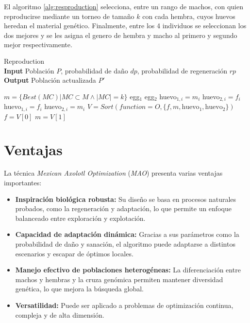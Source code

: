  El algoritmo \ref{alg:resproduction} selecciona, entre un rango de machos, con quien reproducirse mediante un torneo de tamaño $k$ con cada hembra, cuyos huevos heredan el material genético. Finalmente, entre los 4 individuos se seleccionan los dos mejores y se les asigna el genero de hembra y macho al primero y segundo mejor respectivamente.
 
   \begin{algorithm}[H]
 	\caption{Reproduction \\
 		\textbf{Input} Población $P$, probabilidad de daño $dp$, probabilidad de regeneración $rp$ \\
 		\textbf{Output}  Población actualizada $P'$} 
 	\begin{algorithmic}[1]
 			\State $m = \{Best(MC) | MC \subset M \land |MC| = k\}$
 			\State egg$_1$
 			\State egg$_2$
 					\State huevo$_{1,i} = m_i$
 					\State huevo$_{2,i} = f_i$ 
 				\Else
 					\State huevo$_{1,i} = f_i$
 					\State huevo$_{2,i} = m_i$ 
 				\EndIf
 			\EndFor
 		\EndFor
 		\State $V=Sort(function= O, \{ f, m, \text{huevo}_1, \text{huevo}_2 \})$
 		\State $f = V[0]$
 		\State $m = V[1]$
 	\end{algorithmic}
 	\label{alg:resproduction}
 \end{algorithm}
 

\section{Ventajas}

La técnica \textit{Mexican Axolotl Optimization} (\textit{MAO}) presenta varias ventajas importantes:

\begin{itemize}
	\item \textbf{Inspiración biológica robusta:} Su diseño se basa en procesos naturales probados, como la regeneración y adaptación, lo que permite un enfoque balanceado entre exploración y explotación.
	\item \textbf{Capacidad de adaptación dinámica:} Gracias a sus parámetros como la probabilidad de daño y sanación, el algoritmo puede adaptarse a distintos escenarios y escapar de óptimos locales.
	\item \textbf{Manejo efectivo de poblaciones heterogéneas:} La diferenciación entre machos y hembras y la cruza genómica permiten mantener diversidad genética, lo que mejora la búsqueda global.
	\item \textbf{Versatilidad:} Puede ser aplicado a problemas de optimización continua, compleja y de alta dimensión.
\end{itemize}

